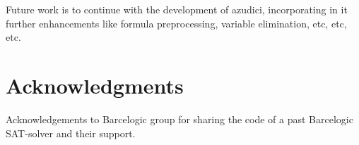 \documentclass{llncs}
\begin{document}
Future work is to continue with the development of  azudici,
incorporating in it further enhancements like formula preprocessing,
variable elimination, etc, etc, etc.

\section*{Acknowledgments}

Acknowledgements to Barcelogic group for sharing the code of a past
Barcelogic SAT-solver and their support.




\end{document}
